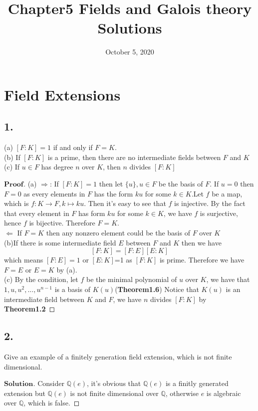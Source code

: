 \documentclass[a4paper, 11pt]{article}
\title{Chapter5 Fields and Galois theory Solutions}
\date{October 5, 2020}
\newenvironment{myprf}
{\renewcommand\qedsymbol{$ $}\begin{proof}[$\mathbf{Proof}$]}
  {\end{proof}}
\newenvironment{solution}
{\renewcommand\qedsymbol{$ $}\begin{proof}[$\mathbf{Solution}$]}
  {\end{proof}}
\begin{document}
       \maketitle

\section*{Field Extensions}
\subsection*{1.}
\noindent
(a) $[F:K]=1$ if and only if $F=K$.\\
(b) If $[F:K]$ is a prime, then there are no intermediate fields between $F$ and $K$\\
(c) If $u\in F$ has degree $n$ over $K$, then $n$ divides $[F:K]$\\
\begin{myprf}
        (a) $\Rightarrow$: If $[F:K]=1$ then let $\{u\},u\in F$ be the basis of $F$. If $u=0$ then $F=0$ as 
        every elements in $F$ has the form $ku$ for some $k\in K$.Let $f$ be a map,
        which is $f:K\rightarrow F, k\mapsto ku$. Then it's easy to see that $f$ is injective.
        By the fact that every element in $F$ has form $ku$ for some $k\in K$, we have
        $f$ is surjective, hence $f$ is bijective. Therefore $F=K$.\\
        \indent
        $\Leftarrow$ If $F=K$ then any nonzero element could be the basis of $F$ over $K$
        \\
        (b)If there is some intermediate field $E$ between $F$ and $K$ then we have
        $$
        [F:K]=[F:E][E:K]
        $$
        which means $[F:E]=1$ or $[E:K]$=1 as $[F:K]$ is prime. Therefore we have $F=E$ 
        or $E=K$ by (a).
        \\
        (c) By the condition, let $f$ be the minimal polynomial of $u$ over $K$, we have
        that $1,u,u^2,...,u^{n-1}$ is a basis of $K(u)$(\textbf{Theorem1.6}) Notice that $K(u)$ is an 
        intermediate field between $K$ and $F$, we have $n$ divides $[F:K]$ by \textbf{Theorem1.2}
\end{myprf}

\subsection*{2.}
\noindent Give an example of a finitely generation field extension, which is not finite 
dimensional.
\begin{solution}
        Consider $\mathbb{Q}(e)$, it's obvious that $\mathbb{Q}(e)$ is a finitly 
        generated extension but $\mathbb{Q}(e)$ is not finite dimensional over 
        $\mathbb{Q}$, otherwise $e$ is algebraic over $\mathbb{Q}$, which is false.
\end{solution}
\end{document}
